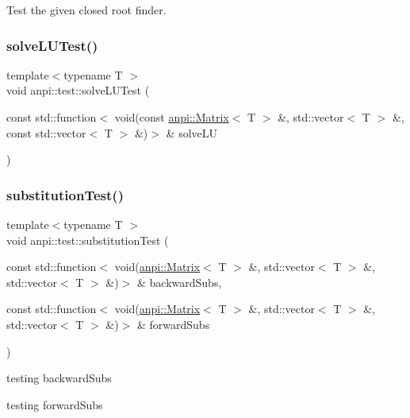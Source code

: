 Test the given closed root finder. 

\mbox{\label{namespaceanpi_1_1test_a48305a842ca50e8175b4baa93d9fc70e}} 
\subsubsection{\texorpdfstring{solve\+L\+U\+Test()}{solveLUTest()}}
{\footnotesize\ttfamily template$<$typename T $>$ \\
void anpi\+::test\+::solve\+L\+U\+Test (\begin{DoxyParamCaption}\item[{const std\+::function$<$ void(const \hyperlink{classanpi_1_1Matrix}{anpi\+::\+Matrix}$<$ T $>$ \&, std\+::vector$<$ T $>$ \&, const std\+::vector$<$ T $>$ \&)$>$ \&}]{solve\+LU }\end{DoxyParamCaption})}

\mbox{\label{namespaceanpi_1_1test_a9d30d26dcfe2c4fe8c7c98c71546d734}} 
\subsubsection{\texorpdfstring{substitution\+Test()}{substitutionTest()}}
{\footnotesize\ttfamily template$<$typename T $>$ \\
void anpi\+::test\+::substitution\+Test (\begin{DoxyParamCaption}\item[{const std\+::function$<$ void(\hyperlink{classanpi_1_1Matrix}{anpi\+::\+Matrix}$<$ T $>$ \&, std\+::vector$<$ T $>$ \&, std\+::vector$<$ T $>$ \&)$>$ \&}]{backward\+Subs,  }\item[{const std\+::function$<$ void(\hyperlink{classanpi_1_1Matrix}{anpi\+::\+Matrix}$<$ T $>$ \&, std\+::vector$<$ T $>$ \&, std\+::vector$<$ T $>$ \&)$>$ \&}]{forward\+Subs }\end{DoxyParamCaption})}

testing backward\+Subs

testing forward\+Subs 